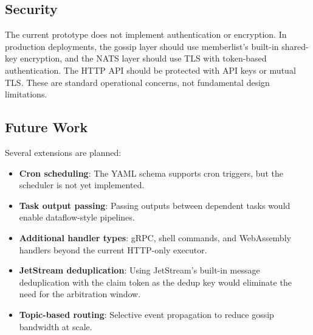 \subsection{Security}

The current prototype does not implement authentication or encryption. In production deployments, the gossip layer should use memberlist's built-in shared-key encryption, and the NATS layer should use TLS with token-based authentication. The HTTP API should be protected with API keys or mutual TLS. These are standard operational concerns, not fundamental design limitations.

\subsection{Future Work}

Several extensions are planned:

\begin{itemize}
\item \textbf{Cron scheduling}: The YAML schema supports cron triggers, but the scheduler is not yet implemented.
\item \textbf{Task output passing}: Passing outputs between dependent tasks would enable dataflow-style pipelines.
\item \textbf{Additional handler types}: gRPC, shell commands, and WebAssembly handlers beyond the current HTTP-only executor.
\item \textbf{JetStream deduplication}: Using JetStream's built-in message deduplication with the claim token as the dedup key would eliminate the need for the arbitration window.
\item \textbf{Topic-based routing}: Selective event propagation to reduce gossip bandwidth at scale.
\end{itemize}
